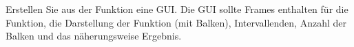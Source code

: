 \begin{aufg}[0]
Erstellen Sie aus der Funktion  eine GUI. Die GUI sollte
Frames enthalten f\"ur die Funktion, die Darstellung der Funktion (mit
Balken), Intervallenden, Anzahl der Balken und das n\"aherungsweise
Ergebnis. 
\end{aufg}